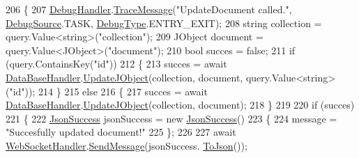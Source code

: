 \begin{DoxyCode}
206         \{
207             \mbox{\hyperlink{class_little_weeb_library_1_1_handlers_1_1_debug_handler}{DebugHandler}}.\mbox{\hyperlink{class_little_weeb_library_1_1_handlers_1_1_debug_handler_afccb37dfd6b2114af72000c2f4fe4607}{TraceMessage}}(\textcolor{stringliteral}{"UpdateDocument called."}, 
      \mbox{\hyperlink{namespace_little_weeb_library_1_1_handlers_a2a6ca0775121c9c503d58aa254d292be}{DebugSource}}.TASK, \mbox{\hyperlink{namespace_little_weeb_library_1_1_handlers_ab66019ed40462876ec4e61bb3ccb0a62}{DebugType}}.ENTRY\_EXIT);
208             \textcolor{keywordtype}{string} collection = query.Value<\textcolor{keywordtype}{string}>(\textcolor{stringliteral}{"collection"});
209             JObject document = query.Value<JObject>(\textcolor{stringliteral}{"document"});
210             \textcolor{keywordtype}{bool} succes = \textcolor{keyword}{false};
211             \textcolor{keywordflow}{if} (query.ContainsKey(\textcolor{stringliteral}{"id"}))
212             \{
213                 succes = await \mbox{\hyperlink{class_little_weeb_library_1_1_handlers_1_1_data_base_handler}{DataBaseHandler}}.\mbox{\hyperlink{class_little_weeb_library_1_1_handlers_1_1_data_base_handler_a9b2223ff71f688234f95d247ea3b5739}{UpdateJObject}}(collection, 
      document, query.Value<\textcolor{keywordtype}{string}>(\textcolor{stringliteral}{"id"}));
214             \}
215             \textcolor{keywordflow}{else}
216             \{
217                 succes = await \mbox{\hyperlink{class_little_weeb_library_1_1_handlers_1_1_data_base_handler}{DataBaseHandler}}.\mbox{\hyperlink{class_little_weeb_library_1_1_handlers_1_1_data_base_handler_a9b2223ff71f688234f95d247ea3b5739}{UpdateJObject}}(collection, 
      document);
218             \}
219 
220             \textcolor{keywordflow}{if} (succes)
221             \{
222                 \mbox{\hyperlink{class_little_weeb_library_1_1_models_1_1_json_success}{JsonSuccess}} jsonSuccess = \textcolor{keyword}{new} \mbox{\hyperlink{class_little_weeb_library_1_1_models_1_1_json_success}{JsonSuccess}}()
223                 \{
224                     message = \textcolor{stringliteral}{"Succesfully updated document!"}
225                 \};
226 
227                 await \mbox{\hyperlink{class_little_weeb_library_1_1_handlers_1_1_web_socket_handler}{WebSocketHandler}}.\mbox{\hyperlink{class_little_weeb_library_1_1_handlers_1_1_web_socket_handler_a1de289d54d665a32c93478c68d3e6ad0}{SendMessage}}(jsonSuccess.
      \mbox{\hyperlink{class_little_weeb_library_1_1_models_1_1_json_success_a407103dc37a77aaf47a782296bab7518}{ToJson}}());

\end{DoxyCode}
